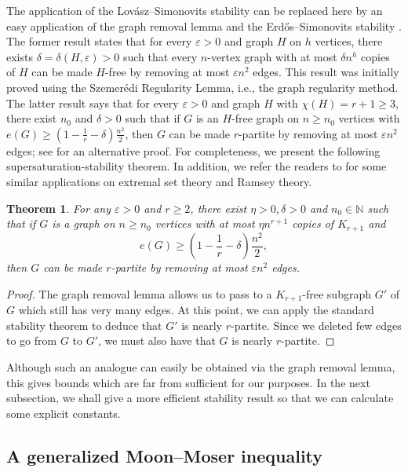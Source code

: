 \documentclass[11pt]{article}
\newtheorem{theorem}{Theorem}[section]
\begin{document}
The application of the Lov\'{a}sz--Simonovits stability can be replaced here by an easy application 
of the graph removal lemma \cite{CF2013} 
and the Erd\H{o}s--Simonovits stability \cite{Sim1966}. 
The former result states that for every $\varepsilon >0$ and graph $H$ on $h$ vertices, there exists $\delta =\delta (H,\varepsilon)>0$ such that every $n$-vertex graph with at most $\delta n^h$ copies of $H$ can be made $H$-free by removing at most $\varepsilon n^2$ edges. This result was initially proved using the Szemerédi Regularity Lemma, i.e., the graph regularity method. The latter result says that for every $\varepsilon >0$ and graph $H$ with $\chi (H)=r+1\ge 3$, there exist $n_0$ and $\delta >0$ such that if $G$ is an $H$-free graph on $n\ge n_0$ vertices with $e(G)\ge (1- \frac{1}{r}- \delta)\frac{n^2}{2}$, then $G$ can be made $r$-partite by removing at most $\varepsilon n^2$ edges; see \cite{Fur2015} for an alternative proof. 
 For completeness, we present the following supersaturation-stability theorem. 
 In addition, we refer the readers to \cite{ADGS2015,CFS2020, FHW2021} 
for some similar applications 
on extremal set theory and Ramsey theory.  

\begin{theorem} \label{thm-CFS-2020}
For any $\varepsilon >0$ and  $r\ge 2$, 
there exist $\eta >0, \delta >0$ and $n_0\in \mathbb{N}$ such that if $G$ 
is a graph on $n\ge n_0$ vertices with at most 
$\eta n^{r+1}$ copies of $K_{r+1}$ and 
\[  e(G) \ge \left(1-\frac{1}{r} -\delta \right)\frac{n^2}{2}, \]  
then $G$ can be made $r$-partite by removing at most 
$\varepsilon n^2$ edges. 
\end{theorem} 

\begin{proof}
The graph removal lemma 
 allows us to pass to a $K_{r+1}$-free subgraph 
$G'$ of $G$ which still has very many edges. At this point, 
we can apply the standard stability theorem 
to deduce that $G'$ is nearly $r$-partite. 
Since we deleted few edges to go from $G$ to $G'$, 
we must also have that $G$ is nearly $r$-partite. 
\end{proof}  


Although such an analogue can easily be obtained via the graph removal lemma, this gives 
bounds which are far from sufficient for our purposes. 
In the next subsection, we shall give a more efficient stability result 
so that we can calculate some explicit constants.




\subsection{A generalized Moon--Moser inequality}
\end{document}
